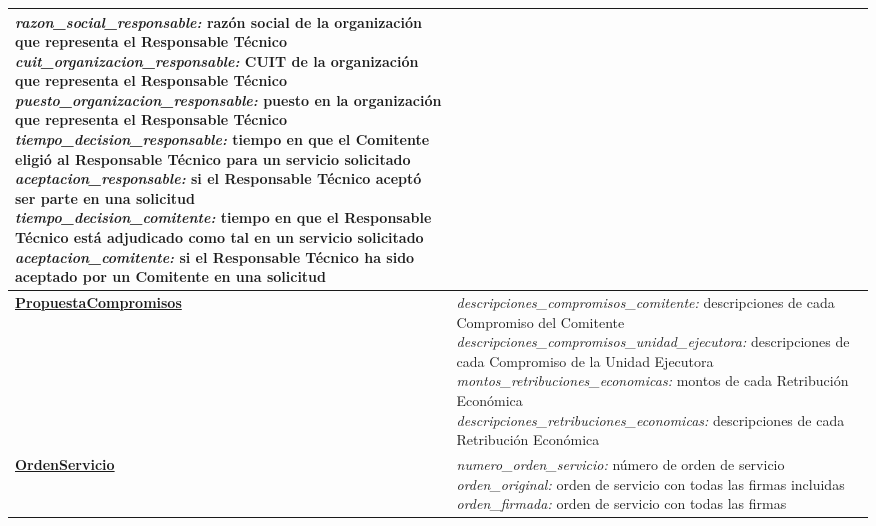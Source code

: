 \begin{center}
\begin{longtable}{ | p{6cm} | p{9.5cm} | }
{		\textit{razon\_social\_responsable:}
		raz\'on social de la organizaci\'on
		que representa el Responsable T\'ecnico
		\hypertarget{C09A02}{} \\
		\textit{cuit\_organizacion\_responsable:}
		CUIT  de la organizaci\'on
		que representa el Responsable T\'ecnico
		\hypertarget{C09A03}{} \\
		\textit{puesto\_organizacion\_responsable:}
		puesto en la organizaci\'on
		que representa el Responsable T\'ecnico
		\hypertarget{C09A04}{} \\
		\textit{tiempo\_decision\_responsable:}
		tiempo en que el Comitente eligi\'o
		al Responsable T\'ecnico para un
		servicio solicitado
		\hypertarget{C09A05}{} \\
		\textit{aceptacion\_responsable:}
		si el Responsable T\'ecnico acept\'o
		ser parte en una solicitud
		\hypertarget{C09A06}{} \\
		\textit{tiempo\_decision\_comitente:}
		tiempo en que el Responsable T\'ecnico
		est\'a adjudicado como tal en un
		servicio solicitado
		\hypertarget{C09A07}{} \\
		\textit{aceptacion\_comitente:}
		si el Responsable T\'ecnico ha sido
		aceptado por un Comitente en una
		solicitud
		\\
	} \\
	\hline
	\hyperlink{propuestacompromisos}{\textbf{PropuestaCompromisos}} &
	\parbox[t]{9.5cm}{
		\vspace{-0.35cm}
		\hypertarget{C10A01}{}
		\textit{descripciones\_compromisos\_comitente:}
		descripciones de cada Compromiso del Comitente
		\hypertarget{C10A02}{} \\
		\textit{descripciones\_compromisos\_unidad\_ejecutora:}
		descripciones de cada Compromiso de la
		Unidad Ejecutora
		\hypertarget{C10A03}{} \\
		\textit{montos\_retribuciones\_economicas:}
		montos de cada Retribuci\'on Econ\'omica
		\hypertarget{C10A04}{} \\
		\textit{descripciones\_retribuciones\_economicas:}
		descripciones de cada Retribuci\'on Econ\'omica \\
	} \\
	\hline
	\hyperlink{ordenservicio}{\textbf{OrdenServicio}} &
	\parbox[t]{9.5cm}{
		\textit{numero\_orden\_servicio:}
		n\'umero de orden de servicio \\
		\textit{orden\_original:}
		orden de servicio con todas las firmas
		incluidas \\
		\textit{orden\_firmada:}
		orden de servicio con todas las firmas
}
\end{longtable}
\end{center}
